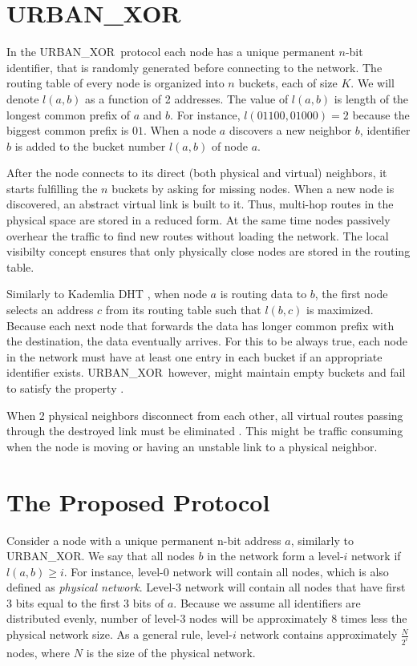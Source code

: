 \documentclass[14pt]{extarticle}
\theoremstyle{definition}
\newcommand{\urbanxor}{URBAN\_XOR}
\begin{document}
\section{\urbanxor}

In the \urbanxor\ protocol each node has a unique permanent $n$-bit identifier, that is randomly generated before connecting to the network. The routing table of every node is organized into $n$ buckets, each of size $K$. We will denote $l(a,b)$ as a function of 2 addresses. The value of $l(a,b)$ is length of the longest common prefix of $a$ and $b$. For instance, $l(01100, 01000) = 2$ because the biggest common prefix is $01$. When a node $a$ discovers a new neighbor $b$, identifier $b$ is added to the bucket number $l(a,b)$ of node $a$.

After the node connects to its direct (both physical and virtual) neighbors, it starts fulfilling the $n$ buckets by asking for missing nodes. When a new node is discovered, an abstract virtual link is built to it. Thus, multi-hop routes in the physical space are stored in a reduced form. At the same time nodes passively overhear the traffic to find new routes without loading the network. The local visibilty concept ensures that only physically close nodes are stored in the routing table.

Similarly to Kademlia DHT \cite{kademlia}, when node $a$ is routing data to $b$, the first node selects an address $c$ from its routing table such that $l(b,c)$ is maximized. Because each next node that forwards the data has longer common prefix with the destination, the data eventually arrives. For this to be always true, each node in the network must have at least one entry in each bucket if an appropriate identifier exists. \urbanxor\, however, might maintain empty buckets and fail to satisfy the property \cite{Pasquini}.

When 2 physical neighbors disconnect from each other, all virtual routes passing through the destroyed link must be eliminated \cite{Pasquini}. This might be traffic consuming when the node is moving or having an unstable link to a physical neighbor.

\section{The Proposed Protocol}

Consider a node with a unique permanent n-bit address $a$, similarly to \urbanxor. We say that all nodes $b$ in the network form a level-$i$ network if $l(a,b) \ge i$. For instance, level-0 network will contain all nodes, which is also defined as \emph{physical network}. Level-3 network will contain all nodes that have first 3 bits equal to the first 3 bits of $a$. Because we assume all identifiers are distributed evenly, number of level-3 nodes will be approximately 8 times less the physical network size. As a general rule, level-$i$ network contains approximately $\frac{N}{2^i}$ nodes, where $N$ is the size of the physical network.
\end{document}
